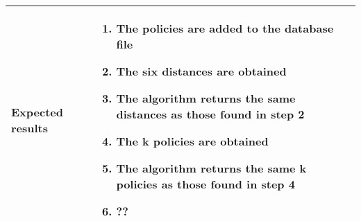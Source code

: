 \documentclass[12pt, fullpage, oneside]{report}
\begin{document}
\begin{center}
\begin{longtable}{ | p{4cm} | p{10cm} | }
			Expected results &	\begin{enumerate}
							\item The policies are added to the database file
							\item The six distances are obtained
							\item The algorithm returns the same distances as those found in step 2
							\item The k policies are obtained
							\item The algorithm returns the same k policies as those found in step 4
							\item ??
						\end{enumerate} \\  [3pt] \hline
	\end{longtable}
\end{center}
\end{document}
